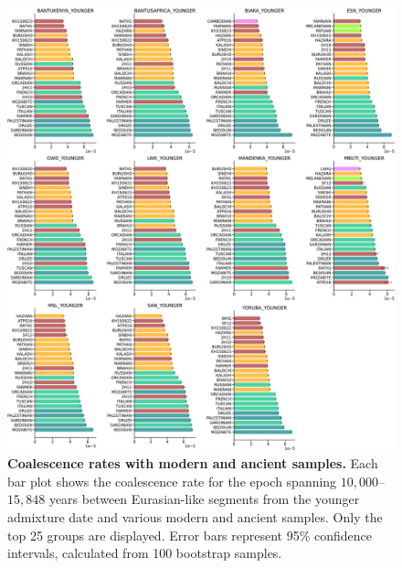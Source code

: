 \begin{figure}
    \centering
    \includegraphics[width=\textwidth]{figures/gb_bta/gb_real_bta_14.pdf}
    \caption{\textbf{Coalescence rates with modern and ancient samples.} Each bar plot shows the coalescence rate for the epoch spanning $10{,}000$–$15{,}848$ years between Eurasian-like segments from the younger admixture date and various modern and ancient samples. Only the top 25 groups are displayed. Error bars represent 95\% confidence intervals, calculated from 100 bootstrap samples.}
    \label{fig:gb-bta-source-supp}
\end{figure}


